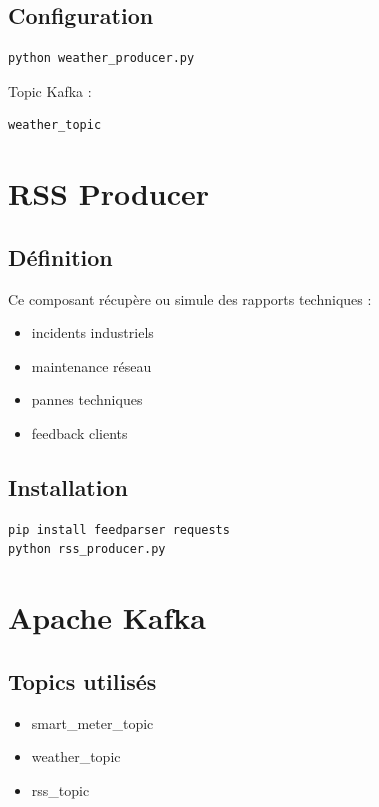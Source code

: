 \documentclass[1pt,a4paper]{report}
\begin{document}
\subsection{Configuration}

\begin{verbatim}
python weather_producer.py
\end{verbatim}

Topic Kafka :

\begin{verbatim}
weather_topic
\end{verbatim}

\section{RSS Producer}

\subsection{Définition}

Ce composant récupère ou simule des rapports techniques :

\begin{itemize}
    \item incidents industriels
    \item maintenance réseau
    \item pannes techniques
    \item feedback clients
\end{itemize}

\subsection{Installation}

\begin{verbatim}
pip install feedparser requests
python rss_producer.py
\end{verbatim}

\section{Apache Kafka}

\subsection{Topics utilisés}

\begin{itemize}
    \item smart\_meter\_topic
    \item weather\_topic
    \item rss\_topic
\end{itemize}
\end{document}

